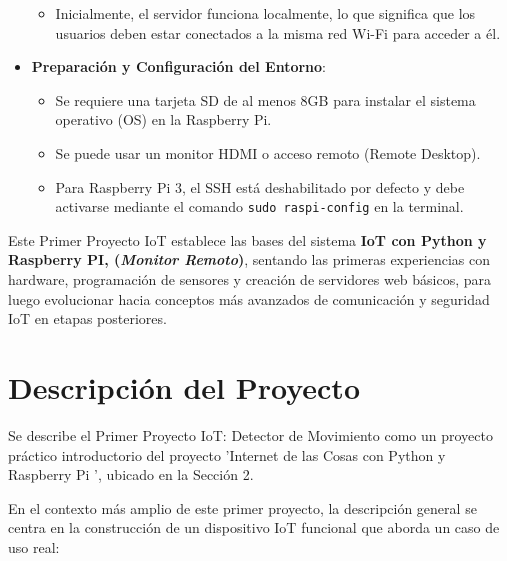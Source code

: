 \documentclass{report}
\begin{document}
\begin{itemize}
\begin{itemize}
        \item Inicialmente, el servidor funciona localmente, lo que significa que los usuarios deben estar conectados a la misma red 
        Wi-Fi para acceder a él.
    \end{itemize}
    \item \textbf{Preparación y Configuración del Entorno}:
    \begin{itemize}
        \item Se requiere una tarjeta SD de al menos 8GB para instalar el sistema operativo (OS) en la Raspberry Pi.
        \item Se puede usar un monitor HDMI o acceso remoto (Remote Desktop).
        \item Para Raspberry Pi 3, el SSH está deshabilitado por defecto y debe activarse mediante el comando \verb|sudo raspi-config| 
        en la terminal.
    \end{itemize}
\end{itemize}
Este Primer Proyecto IoT establece las bases del sistema \textbf{IoT con Python y Raspberry PI, (\textit{Monitor Remoto})}, sentando 
las primeras experiencias con hardware, programación de sensores y creación de servidores web básicos, para luego evolucionar hacia 
conceptos más avanzados de comunicación y seguridad IoT en etapas posteriores.

\section{Descripción del Proyecto}
Se describe el Primer Proyecto IoT: Detector de Movimiento como un proyecto práctico introductorio del proyecto  'Internet de las Cosas con Python y 
Raspberry Pi ', ubicado en la Sección 2.

En el contexto más amplio de este primer proyecto, la descripción general se centra en la construcción de un dispositivo IoT funcional que aborda un 
caso de uso real:
\end{document}
